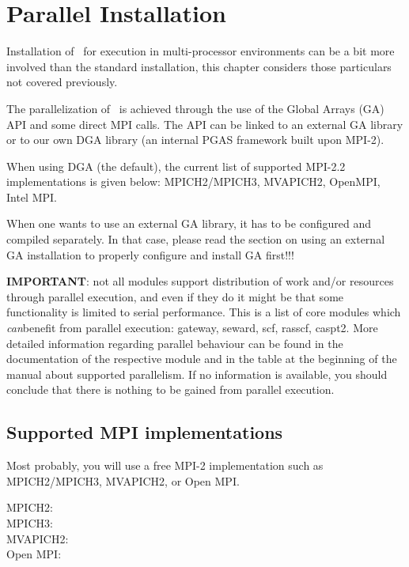 
\section{Parallel Installation}
\label{sec:parallel_installation}

Installation of \molcas\ for execution in multi-processor environments can be a
bit more involved than the standard installation, this chapter considers those
particulars not covered previously.

The parallelization of \molcas\ is achieved through the use of the Global Arrays
(GA) API and some direct MPI calls. The API can be linked to an external GA library
or to our own DGA library (an internal PGAS framework built upon MPI-2).

When using DGA (the default), the current list of supported MPI-2.2 implementations is given below:
MPICH2/MPICH3, MVAPICH2, OpenMPI, Intel MPI.

When one wants to use an external GA library, it has to be configured and
compiled separately.  In that case, please read the section on using an
external GA installation to properly configure and install GA first!!!

\textbf{IMPORTANT}: not all modules support distribution of work and/or
resources through parallel execution, and even if they do it might be that some
functionality is limited to serial performance. This is a list of core modules
which \emph{can}benefit from parallel execution: gateway, seward, scf, rasscf,
caspt2.  More detailed information regarding parallel behaviour can be found in
the documentation of the respective module and in the table at the beginning of
the manual about supported parallelism. If no information is available, you
should conclude that there is nothing to be gained from parallel execution.

\subsection{Supported MPI implementations}

Most probably, you will use a free MPI-2 implementation such as MPICH2/MPICH3,
MVAPICH2, or Open MPI.

MPICH2: \\
MPICH3: \\
MVAPICH2: \\
Open MPI: 

